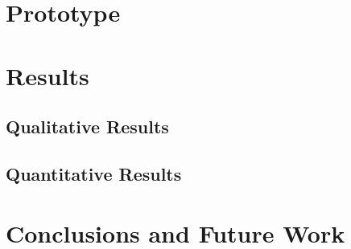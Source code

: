 \documentclass{article}
\begin{document}
\section{Prototype}
\label{sec:prototype}



\section{Results}
\label{sec:results}

\subsection{Qualitative Results}

\subsection{Quantitative Results}


\section{Conclusions and Future Work}
\label{sec:conclusions}
\end{document}
